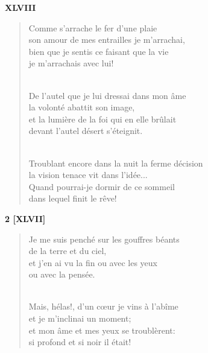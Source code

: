 \documentclass[a4paper,12pt]{book}
\begin{document}
\bigskip


\begin{center}
  \textbf{XLVIII}
\end{center}


\begin{verse}
Comme s'arrache le fer d'une plaie \\
son amour de mes entrailles je m'arrachai, \\
bien que je sentis ce faisant que la vie \\
je m'arrachais avec lui! \\ \

De l'autel que je lui dressai dans mon âme \\
la volonté abattit son image, \\
et la lumière de la foi qui en elle brûlait \\
devant l'autel désert s'éteignit. \\ \

Troublant encore dans la nuit la ferme décision \\
la vision tenace vit dans l'idée... \\
Quand pourrai-je dormir de ce sommeil \\
dans lequel finit le rêve! \\
\end{verse}

\bigskip

\begin{center} {\bf 2 [XLVII]} \end{center}

\begin{verse}
Je me suis penché sur les gouffres béants\\
de la terre et du ciel, \\
et j'en ai vu la fin ou avec les yeux \\
ou avec la pensée. \\ \

Mais, hélas!, d'un c{\oe}ur je vins à l'abîme \\
et je m'inclinai un moment; \\
et mon âme et mes yeux se troublèrent: \\
si profond et si noir il était! \\
\end{verse}
\end{document}
